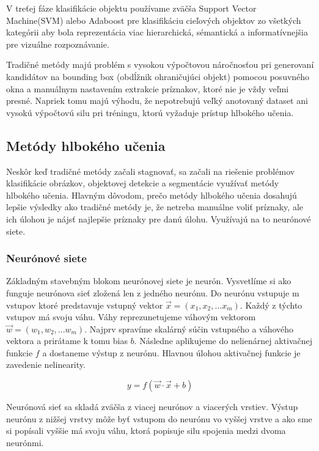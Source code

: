 V treťej fáze klasifikácie objektu používame zväčša Support Vector Machine(SVM) \cite{SVM} alebo Adaboost \cite{Adaboost} pre klasifikáciu cieľových objektov zo všetkých kategórii aby bola reprezentácia viac hierarchická, sémantická a informatívnejšia pre vizuálne rozpoznávanie. 

Tradičné metódy majú problém s vysokou výpočtovou náročnosťou pri generovaní kandidátov na bounding box (obdĺžnik ohraničujúci objekt) pomocou posuvného okna a manuálnym nastavením extrakcie príznakov, ktoré nie je vždy veľmi presné. Napriek tomu majú výhodu, že nepotrebujú veľký anotovaný dataset ani vysokú výpočtovú silu pri tréningu, ktorú vyžaduje prístup hlbokého učenia.

\subsection{Metódy hlbokého učenia}
Neskôr keď tradičné metódy začali stagnovať, sa začali na riešenie problémov klasifikácie obrázkov, objektovej detekcie a segmentácie využívať metódy hlbokého učenia. Hlavným dôvodom, prečo metódy hlbokého učenia dosahujú lepšie výsledky ako tradičné metódy je, že netreba manuálne voliť príznaky, ale ich úlohou je nájsť najlepšie príznaky pre danú úlohu. Využívajú na to neurónové siete. 

\subsubsection{Neurónové siete}
Základným stavebným blokom neurónovej siete je neurón. Vysvetlíme si ako funguje neurónova sieť zložená len z jedného neurónu. Do neurónu vstupuje m vstupov ktoré predstavuje vstupný vektor $\vec{x} = (x_1, x_2, ...  x_m)$. Každý z týchto vstupov má svoju váhu. Váhy reprezunetujeme váhovým vektorom $\vec{w} = (w_1, w_2, ...  w_m)$. Najprv spravíme skalárný súčin vstupného a váhového vektora a prirátame k tomu bias $b$. Následne aplikujeme do nelienárnej aktivačnej funkcie $f$ a dostaneme výstup z neurónu. Hlavnou úlohou aktivačnej funkcie je zavedenie nelinearity. 

\begin{equation}
y = f(\vec{w} \cdot \vec{x} + b) \label{eq:perceptron}
\end{equation}

Neurónová sieť sa skladá zväčša z viacej neurónov a viacerých vrstiev. Výstup neurónu z nižšej vrstvy môže byť vstupom do neurónu vo vyššej vrstve a ako sme si popísali vyššie má svoju váhu, ktorá popisuje silu spojenia medzi dvoma neurónmi.

